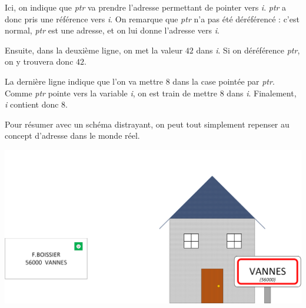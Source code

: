 \documentclass[11pt,a4paper]{article}
\begin{document}
Ici, on indique que \textit{ptr} va prendre l'adresse permettant de pointer vers \textit{i}.
\textit{ptr} a donc pris une référence vers \textit{i}.
On remarque que \textit{ptr} n'a pas été déréférencé : c'est normal, \textit{ptr} est une adresse, et on lui donne l'adresse vers \textit{i}.

Ensuite, dans la deuxième ligne, on met la valeur $ 42 $ dans \textit{i}.
Si on déréférence \textit{ptr}, on y trouvera donc $ 42 $.

La dernière ligne indique que l'on va mettre $ 8 $ dans la case pointée par \textit{ptr}.
Comme \textit{ptr} pointe vers la variable \textit{i}, on est train de mettre $ 8 $ dans \textit{i}.
Finalement, \textit{i} contient donc $ 8 $.


\pagebreak
\vfillFirst


Pour résumer avec un schéma distrayant, on peut tout simplement repenser au concept d'adresse dans le monde réel.

\begin{center}
\includegraphics[width=\textwidth]{img/pointeurs/pointeurs_ville.png}
\end{center}
\end{document}
